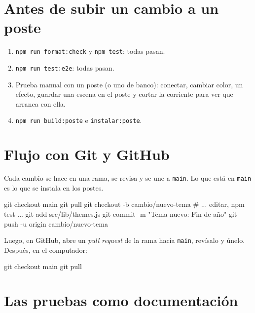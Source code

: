 \section{Antes de subir un cambio a un poste}

\begin{enumerate}
\item \texttt{npm run format:check} y \texttt{npm test}: todas pasan.
\item \texttt{npm run test:e2e}: todas pasan.
\item Prueba manual con un poste (o uno de banco): conectar, cambiar color, un efecto, guardar una escena en el poste y cortar la corriente para ver que arranca con ella.
\item \texttt{npm run build:poste} e \texttt{instalar:poste}.
\end{enumerate}

\section{Flujo con Git y GitHub}

Cada cambio se hace en una rama, se revisa y se une a \texttt{main}. Lo que está en \texttt{main} es lo que se instala en los postes.

\begin{comando}
git checkout main
git pull
git checkout -b cambio/nuevo-tema
# ... editar, npm test ...
git add src/lib/themes.js
git commit -m "Tema nuevo: Fin de año"
git push -u origin cambio/nuevo-tema
\end{comando}

Luego, en GitHub, abre un \emph{pull request} de la rama hacia \texttt{main}, revísalo y únelo. Después, en el computador:
\begin{comando}
git checkout main
git pull
\end{comando}


\section{Las pruebas como documentación}

